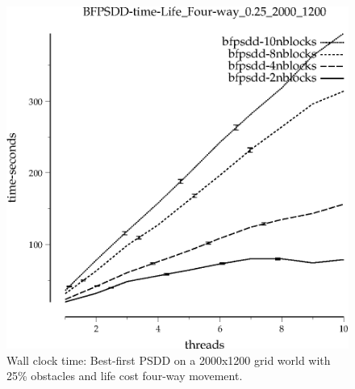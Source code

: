\documentclass{article}
\begin{document}
\begin{appendices}

\begin{figure}[h]
\begin{center}
\includegraphics{../graphs/grid_life_four-way_0.25_2000_1200/BFPSDD-time-Life_Four-way_0.25_2000_1200.eps}
\caption{Wall clock time: Best-first PSDD on a 2000x1200 grid world with 25\%
  obstacles and life cost four-way movement.}
\end{center}
\end{figure}


\end{appendices}
\end{document}
